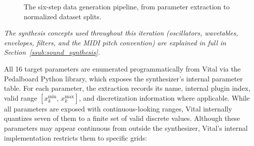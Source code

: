 \begin{figure}[H]
\centering
{}
\vspace{0.3cm}
\caption{The six-step data generation pipeline, from parameter extraction to normalized dataset splits.}
\label{fig:pipeline}
\end{figure}

\noindent{}

\noindent\textit{The synthesis concepts used throughout this iteration (oscillators, wavetables, envelopes, filters, and the MIDI pitch convention) are explained in full in Section~\ref{ssub:sound_synthesis}.}

All 16 target parameters are enumerated programmatically from Vital via the Pedalboard Python library, which exposes the synthesizer's internal parameter table. For each parameter, the extraction records its name, internal plugin index, valid range $[x^{\min}_k,\, x^{\max}_k]$, and discretization information where applicable. While all parameters are exposed with continuous-looking ranges, Vital internally quantizes seven of them to a finite set of valid discrete values. Although these parameters may appear continuous from outside the synthesizer, Vital's internal implementation restricts them to specific grids:

